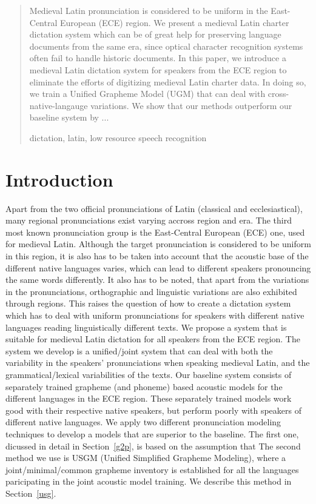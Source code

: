 \documentclass[runningheads,a4paper]{llncs}
\newcommand{\keywords}[1]{\par\addvspace\baselineskip
\noindent\keywordname\enspace\ignorespaces#1}
\begin{document}
%
%
%
%
\begin{abstract}
Medieval Latin pronunciation is considered to be uniform in the East-Central European (ECE) region.
We present a medieval Latin charter dictation system which can be of great help for preserving language documents from the same era, since optical character recognition systems often fail to handle historic documents.
In this paper, we introduce a medieval Latin dictation system for speakers from the ECE region to eliminate the efforts of digitizing medieval Latin charter data.
In doing so, we train a Unified Grapheme Model (UGM) that can deal with cross-native-langauge variations.
We show that our methods outperform our baseline system by ...
\keywords{dictation, latin, low resource speech recognition}
\end{abstract}

\section{Introduction}
Apart from the two official pronunciations of Latin (classical and ecclesiastical), many regional pronunciations exist varying accross region and era.
The third most known pronunciation group is the East-Central European (ECE) one, used for medieval Latin.
Although the target pronunciation is considered to be uniform in this region, it is also has to be taken into account that the acoustic base of the different native languages varies, which can lead to different speakers pronouncing the same words differently.
It also has to be noted, that apart from the variations in the pronunciations, orthographic and linguistic variations are also exhibited through regions.
This raises the question of how to create a dictation system which has to deal with uniform pronunciations for speakers with different native languages reading linguistically different texts.
We propose a system that is suitable for medieval Latin dictation for all speakers from the ECE region.
The system we develop is a unified/joint system that can deal with both the variability in the speakers' pronunciations when speaking medieval Latin, and the grammatical/lexical variabilities of the texts.
Our baseline system consists of separately trained grapheme (and phoneme) based acoustic models for the different languages in the ECE region.
These separately trained models work good with their respective native speakers, but perform poorly with speakers of different native languages.
We apply two different pronunciation modeling techniques to develop a models that are superior to the baseline.
The first one, dicussed in detail in Section~\ref{g2p}, is based on the assumption that 
The second method we use is USGM (Unified Simplified Grapheme Modeling), where a joint/minimal/common grapheme inventory is established for all the languages paricipating in the joint acoustic model training.
We describe this method in Section~\ref{usg}.
\end{document}
